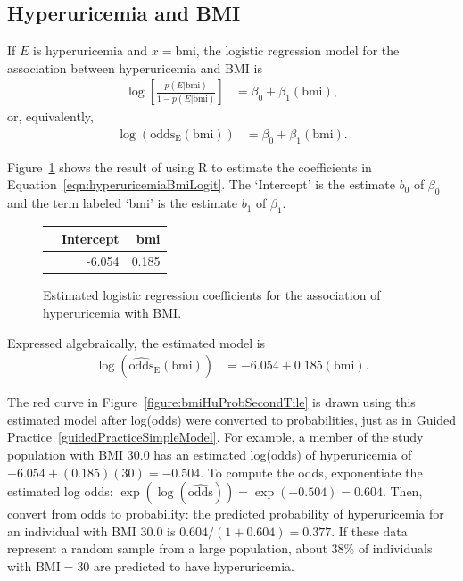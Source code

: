 \subsection{Hyperuricemia and BMI}
\label{section:analyzingHyperuricemia}

If $E$ is hyperuricemia and $x = \text{bmi}$, the logistic regression model for the association between hyperuricemia and BMI is
\begin{align*}
  \log\left[\frac{p(E|\text{bmi})}{1-p(E|\text{bmi})}\right] &=  \beta_0 + \beta_1 (\text{bmi}),
\end{align*}
or, equivalently,
\begin{align}
  \log(\text{odds}_\text{E}(\text{bmi})) &=  \beta_0 + \beta_1 (\text{bmi}).
   \label{eqn:hyperuricemiaBmiLogit}
\end{align}

Figure~\ref{figure:bmiHyperuricemiaLogRegCoeff} shows the result of using \textsf{R} to estimate the coefficients in Equation~\ref{eqn:hyperuricemiaBmiLogit}.  The `Intercept' is the estimate $b_0$  of $\beta_0$ and the term labeled `bmi' is the estimate $b_1$ of $\beta_1$.

\begin{figure}[ht]
\centering
\begin{tabular}{rrr}
  \hline
 & Intercept & bmi  \\
  \hline
 & -6.054 & 0.185  \\
   \hline
\end{tabular}
\caption{Estimated logistic regression coefficients for the association of hyperuricemia with BMI.}
\label{figure:bmiHyperuricemiaLogRegCoeff}
\end{figure}

Expressed algebraically, the estimated model is
\begin{align}
  \log(\widehat{\text{odds}}_\text{E}(\text{bmi})) &= -6.054 + 0.185 (\text{bmi}).
  \label{eqn:bmiHyperuricemiaModel}
\end{align}

The red curve in Figure~\ref{figure:bmiHuProbSecondTile} is drawn using this estimated model after log(odds) were converted to probabilities, just as in Guided Practice~\ref{guidedPracticeSimpleModel}. For example, a member of the study population with BMI 30.0 has an estimated log(odds) of hyperuricemia of $-6.054 + (0.185)(30) = -0.504$. To compute the odds, exponentiate the estimated log odds: $\exp(\log(\widehat{\text{odds}})) = \exp(-0.504) = 0.604$. Then, convert from odds to probability: the predicted probability of hyperuricemia for an individual with BMI 30.0 is $0.604/(1 + 0.604) = 0.377$. If these data represent a random sample from a large population, about 38\% of individuals with $\text{BMI} = 30$ are predicted to have hyperuricemia.

